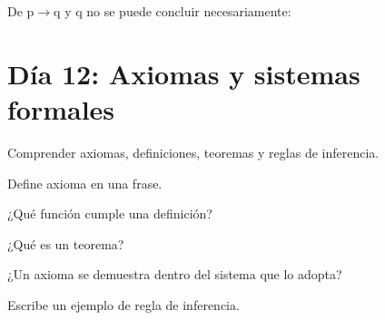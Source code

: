 \begin{activity}[id=dia-11-opcion-02,type=choice,weight=1]

De p\(\to\)q y q no se puede concluir necesariamente:





\end{activity}

\section{Día 12: Axiomas y sistemas formales}

\begin{lesson}[id=dia-12-lectura,weight=0]

Comprender axiomas, definiciones, teoremas y reglas de inferencia.

\end{lesson}

\begin{activity}[id=dia-12-corta-01,type=short,weight=1]

Define axioma en una frase.

\end{activity}

\begin{activity}[id=dia-12-corta-02,type=short,weight=1]

¿Qué función cumple una definición?

\end{activity}

\begin{activity}[id=dia-12-corta-03,type=short,weight=1]

¿Qué es un teorema?

\end{activity}

\begin{activity}[id=dia-12-corta-04,type=short,weight=1]

¿Un axioma se demuestra dentro del sistema que lo adopta?

\end{activity}

\begin{activity}[id=dia-12-corta-05,type=short,weight=1]

Escribe un ejemplo de regla de inferencia.

\end{activity}

